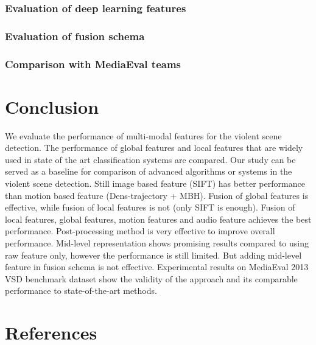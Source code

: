 \documentclass[review]{elsarticle}
\begin{document}
\subsubsection{Evaluation of deep learning features}
\subsubsection{Evaluation of fusion schema}
\subsubsection{Comparison with MediaEval teams}
\section{Conclusion}
We evaluate the performance of multi-modal features for the violent scene detection. The performance of global features and local features that are widely used in state of the art classification systems are compared. Our study can be served as a baseline for comparison of advanced algorithms or systems in the violent scene detection. Still image based feature (SIFT) has better performance than motion based feature (Dens-trajectory + MBH).  Fusion of global features is effective, while fusion of local features is not (only SIFT is enough). Fusion of local features, global features, motion features and audio feature achieves the best performance. Post-processing method is very effective to improve overall performance. Mid-level representation shows promising results compared to using raw feature only, however the performance is still limited. But adding mid-level feature in fusion schema is not effective. Experimental results on MediaEval 2013 VSD benchmark dataset show the validity of the approach and its comparable performance to state-of-the-art methods.

\section*{References}


\end{document}
